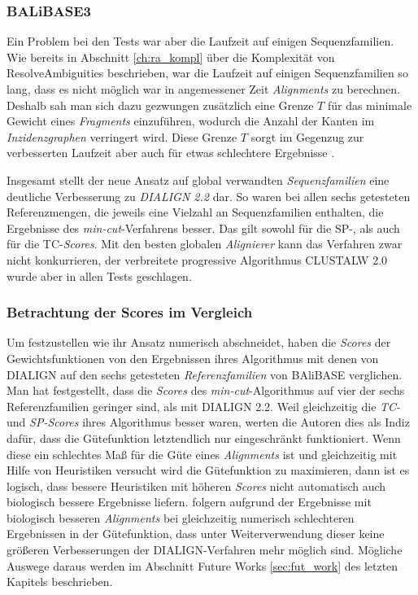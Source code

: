 \subsubsection{BALiBASE3}

Ein Problem bei den Tests war aber die Laufzeit auf einigen Sequenzfamilien. Wie bereits in Abschnitt \ref{ch:ra_kompl} über die Komplexität von \textrm{ResolveAmbiguities} beschrieben, war die Laufzeit auf einigen Sequenzfamilien so lang, dass es nicht möglich war in angemessener Zeit \emph{Alignments} zu berechnen. Deshalb sah man sich dazu gezwungen zusätzlich eine Grenze $T$ für das minimale Gewicht eines \emph{Fragments} einzuführen, wodurch die Anzahl der Kanten im \emph{Inzidenzgraphen} verringert wird. Diese Grenze $T$ sorgt im Gegenzug zur verbesserten Laufzeit aber auch für etwas schlechtere Ergebnisse \citep{cpm10}.

Insgesamt stellt der neue Ansatz auf global verwandten \emph{Sequenzfamilien} eine deutliche Verbesserung zu \emph{DIALIGN 2.2} dar. So waren bei allen sechs getesteten Referenzmengen, die jeweils eine Vielzahl an Sequenzfamilien enthalten, die Ergebnisse des \emph{min-cut}-Verfahrens besser. Das gilt sowohl für die SP-, als auch für die TC-\emph{Scores}. Mit den besten globalen \emph{Alignierer} kann das Verfahren zwar nicht konkurrieren, der verbreitete progressive Algorithmus CLUSTALW 2.0 wurde aber in allen Tests geschlagen. 

\subsubsection{Betrachtung der Scores im Vergleich}

Um festzustellen wie ihr Ansatz numerisch abschneidet, haben \cite{cpm10} die \emph{Scores} der Gewichtsfunktionen von den Ergebnissen ihres Algorithmus mit denen von DIALIGN auf den sechs getesteten \emph{Referenzfamilien} von BAliBASE verglichen. Man hat festgestellt, dass die \emph{Scores} des \emph{min-cut}-Algorithmus auf vier der sechs Referenzfamilien geringer sind, als mit DIALIGN 2.2. Weil gleichzeitig die \emph{TC-} und \emph{SP-Scores} ihres Algorithmus besser waren, werten die Autoren dies als Indiz dafür, dass die Gütefunktion letztendlich nur eingeschränkt funktioniert. Wenn diese ein schlechtes Maß für die Güte eines \emph{Alignments} ist und gleichzeitig mit Hilfe von Heuristiken versucht wird die Gütefunktion zu maximieren, dann ist es logisch, dass bessere Heuristiken mit höheren \emph{Scores} nicht automatisch auch biologisch bessere Ergebnisse liefern. \cite{cpm10} folgern aufgrund der Ergebnisse mit biologisch besseren \emph{Alignments} bei gleichzeitig numerisch schlechteren Ergebnissen in der Gütefunktion, dass unter Weiterverwendung dieser keine größeren Verbesserungen der DIALIGN-Verfahren mehr möglich sind. Mögliche Auswege daraus werden im Abschnitt Future Works \ref{sec:fut_work} des letzten Kapitels beschrieben.

